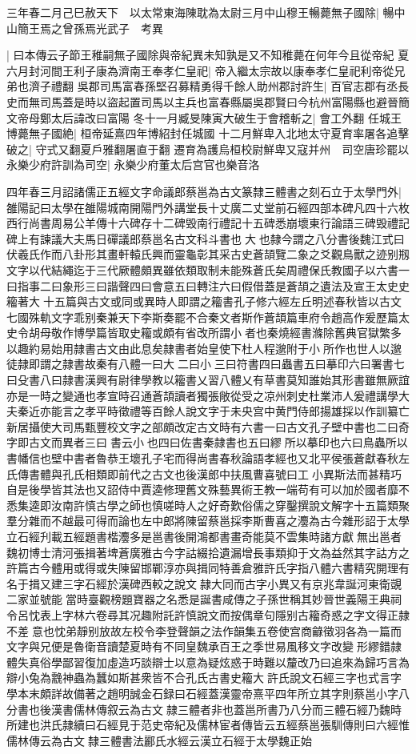三年春二月己巳赦天下　以太常東海陳耽為太尉三月中山穆王暢薨無子國除|{
	暢中山簡王焉之曾孫焉光武子　考異}


|{
	曰本傳云子節王稚嗣無子國除與帝紀異未知孰是又不知稚薨在何年今且從帝紀}
夏六月封河間王利子康為濟南王奉孝仁皇祀|{
	帝入繼太宗故以康奉孝仁皇祀利帝從兄弟也濟子禮翻}
吳郡司馬富春孫堅召募精勇得千餘人助州郡討許生|{
	百官志郡有丞長史而無司馬蓋是時以盜起置司馬以主兵也富春縣屬吳郡賢曰今杭州富陽縣也避晉簡文帝母鄭太后諱改曰富陽}
冬十一月臧旻陳寅大破生于會稽斬之|{
	會工外翻}
任城王博薨無子國絶|{
	桓帝延熹四年博紹封任城國}
十二月鮮卑入北地太守夏育率屠各追擊破之|{
	守式又翻夏戶雅翻屠直于翻}
遷育為護烏桓校尉鮮卑又寇并州　司空唐珍罷以永樂少府許訓為司空|{
	永樂少府董太后宫官也樂音洛}


四年春三月詔諸儒正五經文字命議郎蔡邕為古文篆隸三體書之刻石立于太學門外|{
	雒陽記曰太學在雒陽城南開陽門外講堂長十丈廣二丈堂前石經四部本碑凡四十六枚西行尚書周易公羊傳十六碑存十二碑毁南行禮記十五碑悉崩壞東行論語三碑毁禮記碑上有諫議大夫馬日磾議郎蔡邕名古文科斗書也大也隸今謂之八分書後魏江式曰伏羲氏作而八卦形其畫軒轅氏興而靈龜彰其采古史蒼頡覽二象之爻觀鳥獸之迹别剏文字以代結繩迄于三代厥體頗異雖依類取制未能殊蒼氏矣周禮保氏教國子以六書一曰指事二曰象形三曰諧聲四曰會意五曰轉注六曰假借蓋是蒼頡之遺法及宣王太史史籕著大十五篇與古文或同或異時人即謂之籕書孔子修六經左丘明述春秋皆以古文七國殊軌文字乖别秦兼天下李斯奏罷不合秦文者斯作蒼頡篇車府令趙高作爰歷篇太史令胡母敬作博學篇皆取史籕或頗有省改所謂小者也秦燒經書滌除舊典官獄繁多以趣約易始用隷書古文由此息矣隷書者始皇使下杜人程邈附于小所作也世人以邈徒隷即謂之隷書故秦有八體一曰大二曰小三曰符書四曰蟲書五曰摹印六曰署書七曰殳書八曰隷書漢興有尉律學教以籕書乂習八體乂有草書莫知誰始其形書雖無厥誼亦是一時之變通也孝宣時召通蒼頡讀者獨張敞從受之凉州刺史杜業沛人爰禮講學大夫秦近亦能言之孝平時徵禮等百餘人說文字于未央宫中黄門侍郎揚雄採以作訓纂亡新居攝使大司馬甄豐校文字之部頗改定古文時有六書一曰古文孔子壁中書也二曰奇字即古文而異者三曰書云小也四曰佐書秦隷書也五曰繆所以摹印也六曰鳥蟲所以書幡信也壁中書者魯恭王壞孔子宅而得尚書春秋論語孝經也又北平侯張蒼獻春秋左氏傳書體與孔氏相類即前代之古文也後漢郎中扶風曹喜號曰工小異斯法而甚精巧自是後學皆其法也又詔侍中賈逵修理舊文殊藝異術王教一端苟有可以加於國者靡不悉集逵即汝南許慎古學之師也慎嗟時人之好奇歎俗儒之穿鑿撰說文解字十五篇類聚羣分雜而不越最可得而論也左中郎將陳留蔡邕採李斯曹喜之灋為古今雜形詔于太學立石經刋載五經題書楷灋多是邕書後開鴻都書畫奇能莫不雲集時諸方獻無出邕者魏初博士清河張揖著埤蒼廣雅古今字詁綴拾遺漏增長事類抑于文為益然其字詁方之許篇古今體用或得或失陳留邯鄲淳亦與揖同特善倉雅許氏字指八體六書精究開理有名于揖又建三字石經於漢碑西較之說文隷大同而古字小異又有京兆韋誕河東衛覬二家並號能當時臺觀榜題寶器之名悉是誕書咸傳之子孫世稱其妙晉世義陽王典祠令呂忱表上字林六卷尋其况趣附託許慎說文而按偶章句隱别古籕奇惑之字文得正隷不差意也忱弟靜别放故左校令李登聲韻之法作韻集五卷使宫商龣徵羽各為一篇而文字與兄便是魯衛音讀楚夏時有不同皇魏承百王之季世易風移文字改變形繆錯隷體失真俗學鄙習復加虛造巧談辯士以意為疑炫惑于時難以釐改乃曰追來為歸巧言為辯小兔為䨲神蟲為蠶如斯甚衆皆不合孔氏古書史籕大許氏說文石經三字也式言字學本末頗詳故備著之趙明誠金石録曰石經蓋漢靈帝熹平四年所立其字則蔡邕小字八分書也後漢書儒林傳叙云為古文隷三體者非也蓋邕所書乃八分而三體石經乃魏時所建也洪氏隷續曰石經見于范史帝紀及儒林宦者傳皆云五經蔡邕張馴傳則曰六經惟儒林傳云為古文隸三體書法酈氏水經云漢立石經于太學魏正始}
